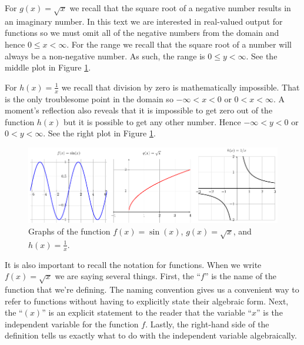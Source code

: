 For $g(x) = \sqrt{x}$ we recall that the square root of a negative number results in an
imaginary number.  In this text we are interested in real-valued output for functions so
we must omit all of the negative numbers from the domain and hence $0 \le x < \infty$.
For the range we recall that the square root of a number will always be a non-negative
number.  As such, the range is $0 \le y < \infty$.  See the middle plot
in Figure \ref{f:0.1ex1}.

For $h(x) = \frac{1}{x}$ we recall that division by zero is mathematically impossible.
That is the only troublesome point in the domain so $-\infty < x < 0$ or $0 < x < \infty$.
A moment's reflection also reveals that it is impossible to get zero out of the function
$h(x)$ but it is possible to get any other number.  Hence $-\infty < y < 0$ or $0 < y <
\infty$. See the right plot in Figure \ref{f:0.1ex1}. 
\afterex
\begin{figure}
    \includegraphics[width=0.95\columnwidth]{figures/0-1-ex1.pdf}
    \caption{Graphs of the function $f(x) = \sin(x)$, $g(x) = \sqrt{x}$, and $h(x) =
    \frac{1}{x}$.}
    \label{f:0.1ex1}
\end{figure}

% 

It is also important to recall the notation for functions.  When we write $f(x) =
\sqrt{x}$ we are saying several things.  First, the ``$f$'' is the name of the function
that we're defining.  The naming convention gives us a convenient way to refer to
functions without having to explicitly state their algebraic form.  Next, the ``$(x)$'' is
an explicit statement to the reader that the variable ``$x$'' is the independent variable
for the function $f$.  Lastly, the right-hand side of the definition tells us exactly what
to do with the independent variable algebraically.  

